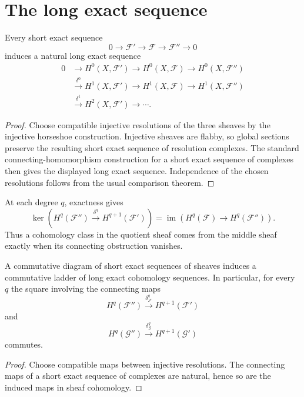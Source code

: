 \section{The long exact sequence}

\begin{theorem}\label{thm:vi48-long-exact}
Every short exact sequence
\[
0\to\mathcal F'\to\mathcal F\to\mathcal F''\to0
\]
induces a natural long exact sequence
\[
\begin{aligned}
0&\to H^0(X,\mathcal F')\to H^0(X,\mathcal F)\to H^0(X,\mathcal F'')\\
&\xrightarrow{\delta^0}H^1(X,\mathcal F')\to H^1(X,\mathcal F)\to H^1(X,\mathcal F'')\\
&\xrightarrow{\delta^1}H^2(X,\mathcal F')\to\cdots .
\end{aligned}
\]
\begin{proof}
Choose compatible injective resolutions of the three sheaves by the injective horseshoe construction.  Injective sheaves are flabby, so global sections preserve the resulting short exact sequence of resolution complexes.  The standard connecting-homomorphism construction for a short exact sequence of complexes then gives the displayed long exact sequence.  Independence of the chosen resolutions follows from the usual comparison theorem.
\end{proof}
\end{theorem}

\begin{proposition}\label{prop:vi48-exactness-mechanism}
At each degree $q$, exactness gives
\[
\ker\!\left(H^q(\mathcal F'')\xrightarrow{\delta^q}H^{q+1}(\mathcal F')\right)
=
\operatorname{im}\!\left(H^q(\mathcal F)\to H^q(\mathcal F'')\right).
\]
Thus a cohomology class in the quotient sheaf comes from the middle sheaf exactly when its connecting obstruction vanishes.
\end{proposition}


\begin{theorem}\label{thm:vi48-naturality}
A commutative diagram of short exact sequences of sheaves induces a commutative ladder of long exact cohomology sequences.  In particular, for every $q$ the square involving the connecting maps
\[
H^q(\mathcal F'')\xrightarrow{\delta^q_{\mathcal F}}H^{q+1}(\mathcal F')
\]
and
\[
H^q(\mathcal G'')\xrightarrow{\delta^q_{\mathcal G}}H^{q+1}(\mathcal G')
\]
commutes.
\begin{proof}
Choose compatible maps between injective resolutions.  The connecting maps of a short exact sequence of complexes are natural, hence so are the induced maps in sheaf cohomology.
\end{proof}
\end{theorem}

